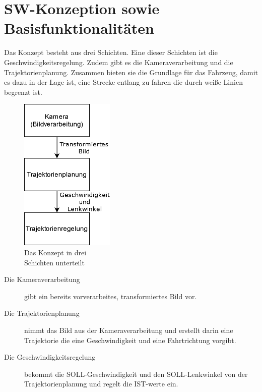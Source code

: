 \section{SW-Konzeption sowie Basisfunktionalitäten}
\label{sec:konzeption-kommunikation}
%
Das Konzept besteht aus drei Schichten. Eine dieser Schichten ist die Geschwindigkeitsregelung. Zudem gibt es die Kameraverarbeitung und die Trajektorienplanung. 
Zusammen %
bieten sie die Grundlage für das Fahrzeug, damit es dazu in der Lage ist, eine Strecke entlang zu fahren die durch weiße Linien begrenzt ist.

\begin{figure}
    \includegraphics[width=0.4\textwidth]{bilder/DreiSchichten.png}
    \caption{Das Konzept in drei \\ Schichten unterteilt%
             \label{fig:dreiSchichten}}
\end{figure}

\begin{description}
    \item [Die Kameraverarbeitung]
    gibt ein bereits vorverarbeites, transformiertes Bild vor.
    \item [Die Trajektorienplanung]
    nimmt das Bild aus der Kameraverarbeitung und erstellt darin eine Trajektorie die eine Geschwindigkeit und eine Fahrtrichtung vorgibt.
    \item [Die Geschwindigkeitsregelung]
    bekommt die SOLL-Geschwindigkeit und den SOLL-Lenkwinkel von der Trajektorienplanung und regelt die IST-werte ein. 
\end{description}


